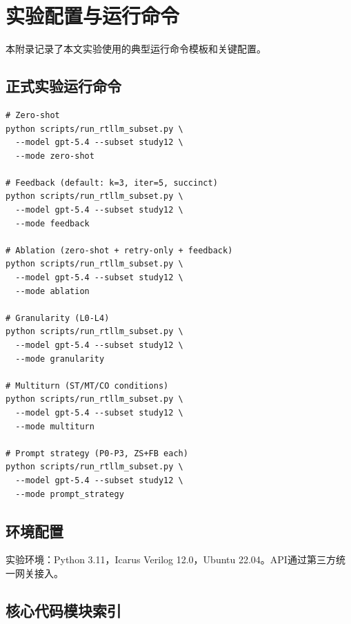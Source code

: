 \chapter{实验配置与运行命令}

本附录记录了本文实验使用的典型运行命令模板和关键配置。

\section{正式实验运行命令}

\begin{verbatim}
# Zero-shot
python scripts/run_rtllm_subset.py \
  --model gpt-5.4 --subset study12 \
  --mode zero-shot

# Feedback (default: k=3, iter=5, succinct)
python scripts/run_rtllm_subset.py \
  --model gpt-5.4 --subset study12 \
  --mode feedback

# Ablation (zero-shot + retry-only + feedback)
python scripts/run_rtllm_subset.py \
  --model gpt-5.4 --subset study12 \
  --mode ablation

# Granularity (L0-L4)
python scripts/run_rtllm_subset.py \
  --model gpt-5.4 --subset study12 \
  --mode granularity

# Multiturn (ST/MT/CO conditions)
python scripts/run_rtllm_subset.py \
  --model gpt-5.4 --subset study12 \
  --mode multiturn

# Prompt strategy (P0-P3, ZS+FB each)
python scripts/run_rtllm_subset.py \
  --model gpt-5.4 --subset study12 \
  --mode prompt_strategy
\end{verbatim}

\section{环境配置}

实验环境：Python 3.11，Icarus Verilog 12.0，Ubuntu 22.04。API通过第三方统一网关接入。

\section{核心代码模块索引}

